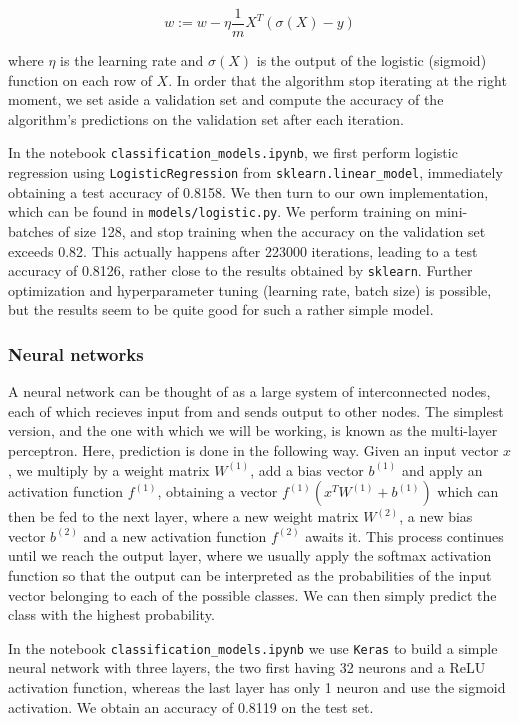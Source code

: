 \documentclass{article}
\begin{document}
\begin{equation}
    w:= w - \eta \frac{1}{m} X^T (\sigma(X) - y)
\end{equation}

where $\eta$ is the learning rate and $\sigma(X)$ is the output of the logistic (sigmoid) function on each row of $X$. In order that the algorithm stop iterating at the right moment, we set aside a validation set and compute the accuracy of the algorithm's predictions on the validation set after each iteration.

In the notebook \texttt{classification\_models.ipynb}, we first perform logistic regression using \texttt{LogisticRegression} from \texttt{sklearn.linear\_model}, immediately obtaining a test accuracy of 0.8158. We then turn to our own implementation, which can be found in \texttt{models/logistic.py}. We perform training on mini-batches of size 128, and stop training when the accuracy on the validation set exceeds 0.82. This actually happens after 223000 iterations, leading to a test accuracy of 0.8126, rather close to the results obtained by \texttt{sklearn}. Further optimization and hyperparameter tuning (learning rate, batch size) is possible, but the results seem to be quite good for such a rather simple model.

\subsubsection{Neural networks}
A neural network can be thought of as a large system of interconnected nodes, each of which recieves input from and sends output to other nodes. The simplest version, and the one with which we will be working, is known as the multi-layer perceptron. Here, prediction is done in the following way. Given an input vector $x$, we multiply by a weight matrix $W^{(1)}$, add a bias vector $b^{(1)}$ and apply an activation function $f^{(1)}$, obtaining a vector $f^{(1)}(x^T W^{(1)} + b^{(1)})$ which can then be fed to the next layer, where a new weight matrix $W^{(2)}$, a new bias vector $b^{(2)}$ and a new activation function $f^{(2)}$ awaits it. This process continues until we reach the output layer, where we usually apply the softmax activation function so that the output can be interpreted as the probabilities of the input vector belonging to each of the possible classes. We can then simply predict the class with the highest probability.

In the notebook \texttt{classification\_models.ipynb} we use \texttt{Keras} to build a simple neural network with three layers, the two first having 32 neurons and a ReLU activation function, whereas the last layer has only 1 neuron and use the sigmoid activation. We obtain an accuracy of 0.8119 on the test set.
\end{document}
